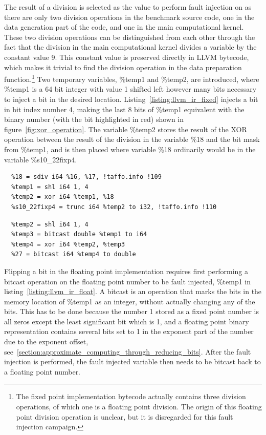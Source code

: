 The result of a division is selected as the value to perform fault injection on as there are only two division operations in the benchmark source code, one in the data generation part of the code, and one in the main computational kernel. These two division operations can be distinguished from each other through the fact that the division in the main computational kernel divides a variable by the constant value 9. This constant value is preserved directly in LLVM bytecode, which makes it trivial to find the division operation in the data preparation function.\footnote{The fixed point implementation bytecode actually contains three division operations, of which one is a floating point division. The origin of this floating point division operation is unclear, but it is disregarded for this fault injection campaign.}
Two temporary variables, \%temp1 and \%temp2, are introduced, where \%temp1 is a 64 bit integer with value 1 shifted left however many bits necessary to inject a bit in the desired location. Listing~\ref{listing:llvm_ir_fixed} injects a bit in bit index number 4, making the last 8 bits of \%temp1 equivalent with the binary number (with the bit highlighted in red) shown in figure~\ref{fig:xor_operation}.
The variable \%temp2 stores the result of the XOR operation between the result of the division in the variable \%18 and the bit mask from \%temp1, and is then placed where variable \%18 ordinarily would be in the variable \%s10\_22fixp4.

\begin{lstlisting}[caption=fixed point bit flip in LLVM bytecode, label=listing:llvm_ir_fixed]
  %17 = sext i32 %0 to i64, !taffo.info !45
  %18 = sdiv i64 %16, %17, !taffo.info !109
  %temp1 = shl i64 1, 4
  %temp2 = xor i64 %temp1, %18
  %s10_22fixp4 = trunc i64 %temp2 to i32, !taffo.info !110
\end{lstlisting} 

\begin{lstlisting}[caption=floating point bit flip in LLVM bytecode, label=listing:llvm_ir_float]
  %temp1 = fdiv double %24, %26
  %temp2 = shl i64 1, 4
  %temp3 = bitcast double %temp1 to i64
  %temp4 = xor i64 %temp2, %temp3
  %27 = bitcast i64 %temp4 to double
\end{lstlisting}

Flipping a bit in the floating point implementation requires first performing a bitcast operation on the floating point number to be fault injected, \%temp1 in listing~\ref{listing:llvm_ir_float}. A bitcast is an operation that marks the bits in the memory location of \%temp1 as an integer, without actually changing any of the bits. This has to be done because the number 1 stored as a fixed point number is all zeros except the least significant bit which is 1, and a floating point binary representation contains several bits set to 1 in the exponent part of the number due to the exponent offset, see~\ref{section:approximate_computing_through_reducing_bits}. After the fault injection is performed, the fault injected variable then needs to be bitcast back to a floating point number.

